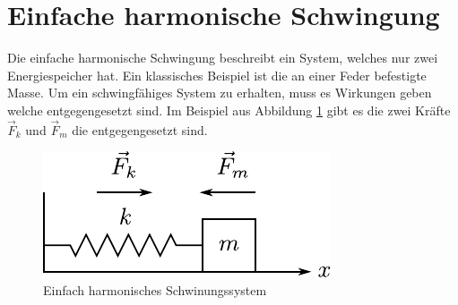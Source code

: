 



\section{Einfache harmonische Schwingung}
Die einfache harmonische Schwingung beschreibt ein System, welches 
nur zwei Energiespeicher hat. Ein klassisches Beispiel
ist die an einer Feder befestigte Masse. Um ein 
schwingfähiges System zu erhalten, muss es Wirkungen geben welche
entgegengesetzt sind. Im Beispiel aus Abbildung 
\ref{fig:einfache-harmonische} gibt es die zwei Kräfte $\vec{F}_k$ und
$\vec{F}_m$ die entgegengesetzt sind.

\begin{figure}[h!]
	\centering
	\includegraphics[scale=0.75]{../fig/einfache-harmonische.pdf}
	\caption{Einfach harmonisches Schwinungssystem}
	\label{fig:einfache-harmonische}
\end{figure}


